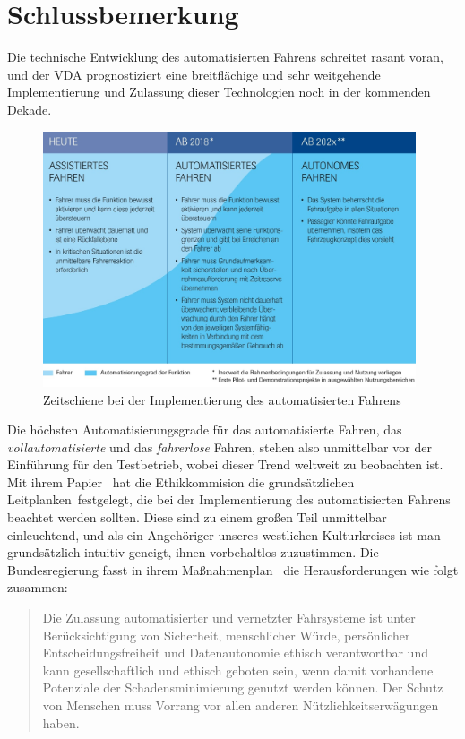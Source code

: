 \documentclass[twoside,a4paper,12pt]{article}
\begin{document}
\newpage

\section{Schlussbemerkung}

Die technische Entwicklung des automatisierten Fahrens schreitet rasant voran, und der VDA prognostiziert eine breitflächige und sehr weitgehende Implementierung
und Zulassung dieser Technologien noch in der kommenden Dekade.\\

\begin{figure}[H]
\centering
\includegraphics[width=11cm]{resources/zeitschiene-automatisierungsgrade.jpg}
\caption[Zeitschiene bei der Implementierung des automatisierten Fahrens]{Zeitschiene bei der Implementierung des automatisierten Fahrens~\cite{vda}}
\label{figure:ZeitschieneAutomatisierungsgrade}
\end{figure}

Die höchsten Automatisierungsgrade für das automatisierte Fahren, das \textit{vollautomatisierte} und das \textit{fahrerlose} Fahren, stehen also unmittelbar
vor der Einführung für den Testbetrieb, wobei dieser Trend weltweit zu beobachten ist.
Mit ihrem Papier~\cite{ek} hat die Ethikkommision die grundsätzlichen \glqq Leitplanken\grqq\ festgelegt, die bei der Implementierung des automatisierten Fahrens
beachtet werden sollten. Diese sind zu einem großen Teil unmittelbar einleuchtend, und als ein Angehöriger unseres westlichen Kulturkreises ist man grundsätzlich
intuitiv geneigt, ihnen vorbehaltlos zuzustimmen. Die Bundesregierung fasst in ihrem Maßnahmenplan~\cite{bmvi5} die Herausforderungen wie folgt zusammen:

\begin{quote}
\glqq
Die Zulassung automatisierter und vernetzter Fahrsysteme ist unter Berücksichtigung von Sicherheit, menschlicher Würde, persönlicher Entscheidungsfreiheit und Datenautonomie ethisch verantwortbar und kann gesellschaftlich und ethisch geboten sein, wenn damit vorhandene Potenziale der Schadensminimierung genutzt werden können. Der Schutz von Menschen muss Vorrang vor allen anderen Nützlichkeitserwägungen haben.\grqq\mbox{~\cite[S. 3]{bmvi5}}
\end{quote}
\end{document}

